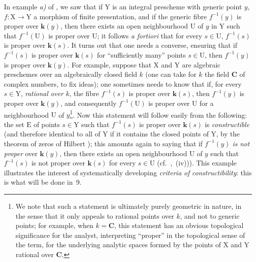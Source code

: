 \begin{env}[8.1.3]
\label{IV.8.1.3}
In example \emph{a)} of , we saw that if $\mathrm{Y}$ is an integral prescheme with generic point $y$, $f:\mathrm{X}\to\mathrm{Y}$ a morphism of finite presentation, and if the generic fibre $f^{-1}(y)$ is proper over $\boldsymbol{k}(y)$, then there exists an open neighbourhood $\mathrm{U}$ of $y$ in $\mathrm{Y}$ such that $f^{-1}(\mathrm{U})$ is proper over $\mathrm{U}$; it follows \emph{a fortiori} that for every $s\in\mathrm{U}$, $f^{-1}(s)$ is proper over $\boldsymbol{k}(s)$.
It turns out that one needs a converse, ensuring that if $f^{-1}(s)$ is proper over $\boldsymbol{k}(s)$ for ``sufficiently many'' points $s\in\mathrm{U}$, then $f^{-1}(y)$ is proper over $\boldsymbol{k}(y)$.
For example, suppose that $\mathrm{X}$ and $\mathrm{Y}$ are algebraic preschemes over an algebraically closed field $k$ (one can take for $k$ the field $\mathbf{C}$ of complex numbers, to fix ideas); one sometimes needs to know that if, for every $s\in\mathrm{Y}$, \emph{rational over $k$}, the fibre $f^{-1}(s)$ is proper over $\boldsymbol{k}(s)$, then $f^{-1}(y)$ is proper over $\boldsymbol{k}(y)$, and consequently $f^{-1}(\mathrm{U})$ is proper over $\mathrm{U}$ for a neighbourhood $\mathrm{U}$ of $y$\footnote{We note that such a statement is ultimately purely geometric in nature, in the sense that it only appeals to rational points over $k$, and not to generic points; for example, when $k=\mathbf{C}$, this statement has an obvious topological significance for the analyst, interpreting ``proper'' in the topological sense of the term, for the underlying analytic spaces formed by the points of $\mathrm{X}$ and $\mathrm{Y}$ rational over $\mathbf{C}$.}.
Now this statement will follow easily from the following: the set $\mathrm{E}$ of points $s\in\mathrm{Y}$ such that $f^{-1}(s)$ is proper over $\boldsymbol{k}(s)$ is \emph{constructible} (and therefore identical to all of $\mathrm{Y}$ if it contains the closed points of $\mathrm{Y}$, by the theorem of zeros of Hilbert ); this amounts again to saying that if $f^{-1}(y)$ \emph{is not proper} over $\boldsymbol{k}(y)$, then there exists an open neighbourhood $\mathrm{U}$ of $y$ such that $f^{-1}(s)$ is not proper over $\boldsymbol{k}(s)$ for every $s\in\mathrm{U}$ (cf.\ ,~(iv))).
This example illustrates the interest of systematically developing \emph{criteria of constructibility}: this is what will be done in \textsection\,9.
\end{env}

